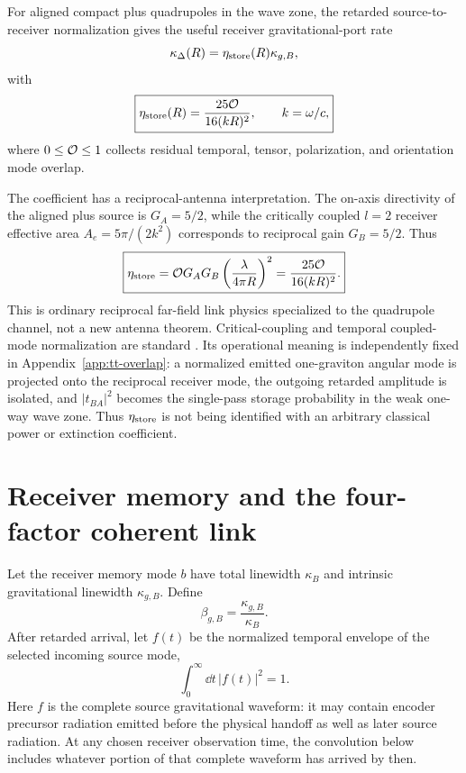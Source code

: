 For aligned compact plus quadrupoles in the wave zone, the retarded source-to-receiver normalization gives the useful receiver gravitational-port rate
\begin{equation}
\kappa_\Delta(R)=\eta_{\rm store}(R)\kappa_{g,B},
\end{equation}
with
\begin{equation}
\boxed{
\eta_{\rm store}(R)=\frac{25\mathcal O}{16(kR)^2},
\qquad k=\omega/c,}
\label{eq:etastore}
\end{equation}
where $0\le\mathcal O\le1$ collects residual temporal, tensor, polarization, and orientation mode overlap.

The coefficient has a reciprocal-antenna interpretation. The on-axis directivity of the aligned plus source is $G_A=5/2$, while the critically coupled $l=2$ receiver effective area $A_e=5\pi/(2k^2)$ corresponds to reciprocal gain $G_B=5/2$. Thus
\begin{equation}
\boxed{
\eta_{\rm store}
=\mathcal O G_AG_B\left(\frac{\lambda}{4\pi R}\right)^2
=\frac{25\mathcal O}{16(kR)^2}.}
\label{eq:friis}
\end{equation}
This is ordinary reciprocal far-field link physics specialized to the quadrupole channel, not a new antenna theorem. Critical-coupling and temporal coupled-mode normalization are standard \cite{RuanFan2012}. Its operational meaning is independently fixed in Appendix~\ref{app:tt-overlap}: a normalized emitted one-graviton angular mode is projected onto the reciprocal receiver mode, the outgoing retarded amplitude is isolated, and $|t_{BA}|^2$ becomes the single-pass storage probability in the weak one-way wave zone. Thus $\eta_{\rm store}$ is not being identified with an arbitrary classical power or extinction coefficient.

\section{Receiver memory and the four-factor coherent link}
\label{sec:memory}

Let the receiver memory mode $b$ have total linewidth $\kappa_B$ and intrinsic gravitational linewidth $\kappa_{g,B}$. Define
\begin{equation}
\boxed{\beta_{g,B}=\frac{\kappa_{g,B}}{\kappa_B}.}
\label{eq:betaB}
\end{equation}
After retarded arrival, let $f(t)$ be the normalized temporal envelope of the selected incoming source mode,
\begin{equation}
\int_0^\infty\dd t\,|f(t)|^2=1.
\end{equation}
Here $f$ is the complete source gravitational waveform: it may contain encoder precursor radiation emitted before the physical handoff as well as later source radiation. At any chosen receiver observation time, the convolution below includes whatever portion of that complete waveform has arrived by then.

